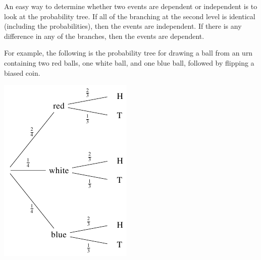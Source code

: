 \documentclass{ximera}
\begin{document}
An easy way to determine whether two events are dependent or independent is to look at the probability tree. If all of the branching at the second level is identical (including the probabilities), then the events are independent. If there is any difference in any of the branches, then the events are dependent.

For example, the following is the probability tree for drawing a ball from an urn containing two red balls, one white ball, and one blue ball, followed by flipping a biased coin.

\begin{image}
\includegraphics{ProbTree1.png}
\end{image}
\end{document}
